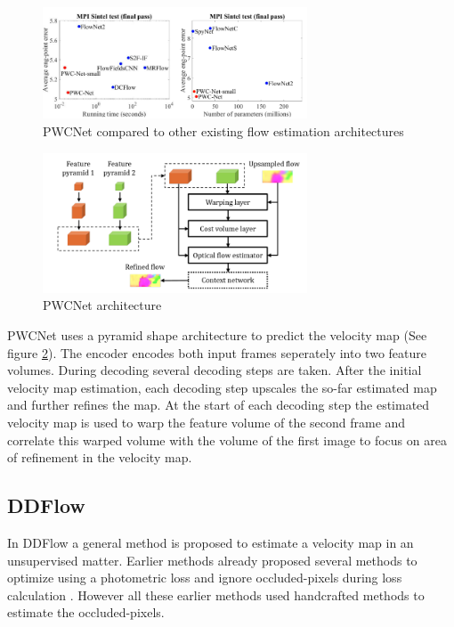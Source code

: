 \begin{figure}[h]
\centering
\includegraphics[width=0.7\textwidth]{images/pwcnet_improvements}
\caption{PWCNet compared to other existing flow estimation architectures}
\label{fig:pwc_compare}
\end{figure}

\begin{figure}[h]
\centering
\includegraphics[width=0.7\textwidth]{images/pwcnet_approach}
\caption{PWCNet architecture}
\label{fig:pwc_approach}
\end{figure}

PWCNet uses a pyramid shape architecture to predict the velocity map (See figure \ref{fig:pwc_approach}). The encoder encodes both input frames seperately into two feature volumes. During decoding several decoding steps are taken. After the initial velocity map estimation, each decoding step upscales the so-far estimated map and further refines the map. At the start of each decoding step the estimated velocity map is used to warp the feature volume of the second frame and correlate this warped volume with the volume of the first image to focus on area of refinement in the velocity map.

\subsection{DDFlow}
In DDFlow \cite{liu_ddflow_2019} a general method is proposed to estimate a velocity map in an unsupervised matter. Earlier methods already proposed several methods to optimize using a photometric loss \cite{Yu2016} and ignore occluded-pixels during loss calculation \cite{Janai2018}. However all these earlier methods used handcrafted methods to estimate the occluded-pixels.

